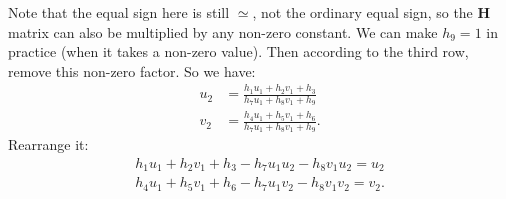 Note that the equal sign here is still $\simeq$, not the ordinary equal sign, so the $\mathbf{H}$ matrix can also be multiplied by any non-zero constant. We can make $h_9 = 1$ in practice (when it takes a non-zero value). Then according to the third row, remove this non-zero factor. So we have:
\[
\begin{aligned}
u_{2}&=\frac{h_{1}u_{1}+h_{2}v_{1}+h_{3}}{h_{7}u_{1}+h_{8}v_{1}+h_{9}}\\
v_{2}&=\frac{h_{4}u_{1}+h_{5}v_{1}+h_{6}}{h_{7}u_{1}+h_{8}v_{1}+h_{9}}.
\end{aligned}
\]
Rearrange it:
\[
\begin{gathered}
h_{1}u_{1}+h_{2}v_{1}+h_{3}-h_{7}u_{1}u_{2}-h_{8}v_{1}u_{2}=u_{2}\\
h_{4}u_{1}+h_{5}v_{1}+h_{6}-h_{7}u_{1}v_{2}-h_{8}v_{1}v_{2}=v_{2}.
\end{gathered}
\]


